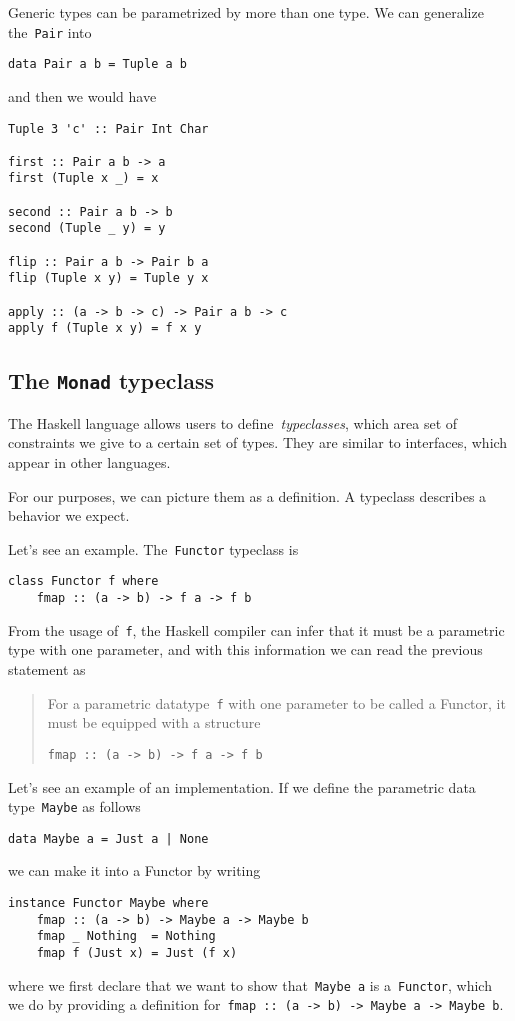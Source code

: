 \documentclass[a4paper]{article}
\theoremstyle{plain}
\theoremstyle{definition}
\begin{document}
Generic types can be parametrized by more than one type. We can generalize
the~\texttt{Pair} into
\begin{verbatim}
data Pair a b = Tuple a b
\end{verbatim}
and then we would have
\begin{verbatim}
Tuple 3 'c' :: Pair Int Char

first :: Pair a b -> a
first (Tuple x _) = x

second :: Pair a b -> b
second (Tuple _ y) = y

flip :: Pair a b -> Pair b a
flip (Tuple x y) = Tuple y x

apply :: (a -> b -> c) -> Pair a b -> c
apply f (Tuple x y) = f x y
\end{verbatim}

\subsection{The \texorpdfstring{\texttt{Monad}}{Monad} typeclass}
The Haskell language allows users to define~\emph{typeclasses}, which area set
of constraints we give to a certain set of types.
They are similar to interfaces, which appear in other languages.

For our purposes, we can picture them as a definition. A typeclass describes a
behavior we expect.

Let's see an example. The~\texttt{Functor} typeclass is
\begin{verbatim}
class Functor f where
    fmap :: (a -> b) -> f a -> f b
\end{verbatim}
From the usage of~\texttt{f}, the Haskell compiler can infer
that it must be a parametric type with one parameter, and
with this information we can read the previous statement as
\begin{quote}
    For a parametric datatype~\texttt{f} with one parameter to be
    called a Functor, it must be equipped with a structure

    \texttt{fmap :: (a -> b) -> f a -> f b}
\end{quote}

Let's see an example of an implementation. If we define the parametric data
type~\texttt{Maybe} as follows
\begin{verbatim}
data Maybe a = Just a | None
\end{verbatim}
we can make it into a Functor by writing
\begin{verbatim}
instance Functor Maybe where
    fmap :: (a -> b) -> Maybe a -> Maybe b
    fmap _ Nothing  = Nothing
    fmap f (Just x) = Just (f x)
\end{verbatim}
where we first declare that we want to show that~\texttt{Maybe a}
is a~\texttt{Functor}, which we do by providing a definition
for~\texttt{fmap :: (a -> b) -> Maybe a -> Maybe b}.
\end{document}
